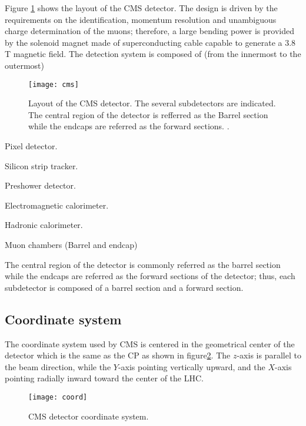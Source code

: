 \noindent Figure \ref{fig:cms} shows the layout of the CMS detector. The design is driven by the requirements on the identification, momentum resolution and unambiguous charge determination of the muons; therefore, a large bending power is provided by the solenoid magnet made of superconducting cable capable to generate a 3.8 T magnetic field. The detection system is composed of (from the innermost to the outermost)

\begin{figure}[!h]
  \centering
  \texttt{[image: cms]}
  \caption[Layout of the CMS detector]{Layout of the CMS detector. The several subdetectors are indicated. The central region of the detector is refferred as the Barrel section while the endcaps are referred as the forward sections. \cite{cms_drawing}.}
  \label{fig:cms}
\end{figure}

\noindent 

\bit
\item Pixel detector.
\item Silicon strip tracker.
\item Preshower detector.
\item Electromagnetic calorimeter.
\item Hadronic calorimeter.
\item Muon chambers (Barrel and endcap)
\eit

\noindent The central region of the detector is commonly referred as the barrel section while the endcaps are referred as the forward sections of the detector; thus, each subdetector is composed of a barrel section and a forward section. 


\subsection{Coordinate system}
\noindent The coordinate system used by CMS is centered in the geometrical center of the detector which is the same as the CP as shown in figure\ref{fig:coord}. The $z$-axis is parallel to the beam direction, while the $Y$-axis pointing vertically upward, and the $X$-axis pointing radially inward toward the center of the LHC.

\begin{figure}[h!]
  \centering
  \texttt{[image: coord]}
  \caption[CMS detector coordinate system]{CMS detector coordinate system.}
  \label{fig:coord}
\end{figure}

